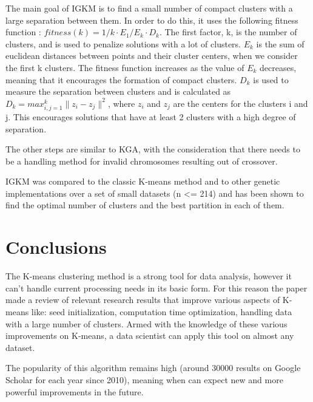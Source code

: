 \documentclass[12pt]{article}
\begin{document}
	The main goal of IGKM is to find a small number of compact clusters with a large separation between them. In order to do this, it uses the following fitness function : \(fitness(k) = 1/k \cdot E_1/E_k \cdot D_k \). The first factor, k, is the number of clusters, and is used to penalize solutions with a lot of clusters. \(E_k\) is the sum of euclidean distances between points and their cluster centers, when we consider the first k clusters. The fitness function increases as the value of \(E_k\) decreases, meaning that it encourages the formation of compact clusters. \(D_k\) is used to measure the separation between clusters and is calculated as \(D_k=max_{i,j=1}^k \|z_i - z_j\|^2 \), where \(z_i\) and \(z_j\) are the centers for the clusters i and j. This encourages solutions that have at least 2 clusters with a high degree of separation.
	
	The other steps are similar to KGA\cite{EvolutionaryKMeans}, with the consideration that there needs to be a handling method for invalid chromosomes resulting out of crossover.
	
	IGKM was compared to the classic K-means method and to other genetic implementations over a set of small datasets (n <= 214) and has been shown to find the optimal number of clusters and the best partition in each of them.
	
	\section{Conclusions}
	The K-means clustering method is a strong tool for data analysis, however it can't handle current processing needs in its basic form. For this reason the paper made a review of relevant research results that improve various aspects of K-means like: seed initialization, computation time optimization, handling data with a large number of clusters. Armed with the knowledge of these various improvements on K-means, a data scientist can apply this tool on almost any dataset.
	
	The popularity of this algorithm remains high (around 30000 results on Google Scholar for each year since 2010\cite{GoogleScholarPlot}), meaning when can expect new and more powerful improvements in the future.
	
	\newpage
	
	
\end{document}
